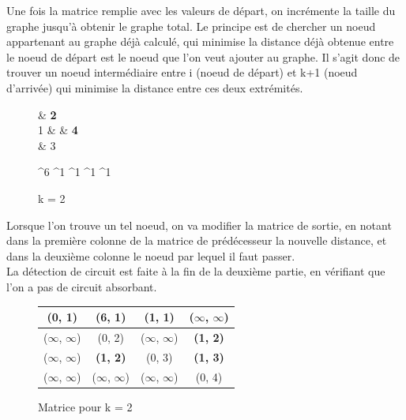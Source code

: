 \documentclass[a4paper,12pt,final] {article}
\begin{document}
Une fois la matrice remplie avec les valeurs de départ, on incrémente la taille du graphe jusqu'à obtenir le graphe total. Le principe est de chercher un noeud appartenant au graphe déjà calculé, qui minimise la distance déjà obtenue entre le noeud de départ est le noeud que l'on veut ajouter au graphe. Il s'agit donc de trouver un noeud intermédiaire entre i (noeud de départ) et  k+1 (noeud d'arrivée) qui minimise la distance entre ces deux extrémités.\\

\begin{figure}[H]
 \centering
 \begin{psmatrix}[mnode=circle]
	    & {\color{red} \bf 2}\\
	 1 &    & {\color{red} \bf 4}\\
	    & 3\\
\end{psmatrix}
	
	^{6}
	^{1}
	^{1}
	^{1}
	^{1}

  \caption{k = 2}
\end{figure}

Lorsque l'on trouve un tel noeud, on va modifier la matrice de sortie, en notant dans la première colonne de la matrice de prédécesseur la nouvelle distance, et dans la deuxième colonne le noeud par lequel il faut passer.\\

La détection de circuit est faite à la fin de la deuxième partie, en vérifiant que l'on a pas de circuit absorbant.

\begin{figure}[H]
\begin{center}
\begin{tabular}{|c|c|c|c|}
\hline
(0, 1) & (6, 1) & (1, 1) & ($\infty$, $\infty$) \\
\hline
($\infty$, $\infty$) & (0, 2) & ($\infty$, $\infty$) & {\color{red} \bf (1, 2)} \\
\hline
($\infty$, $\infty$) & {\color{red} \bf (1, 2)} & (0, 3) & {\color{red} \bf (1, 3)}\\
\hline
($\infty$, $\infty$) & ($\infty$, $\infty$) & ($\infty$, $\infty$) & (0, 4) \\
\hline
\end{tabular}
\end{center}
\caption{Matrice pour k = 2}
\end{figure}
\end{document}
